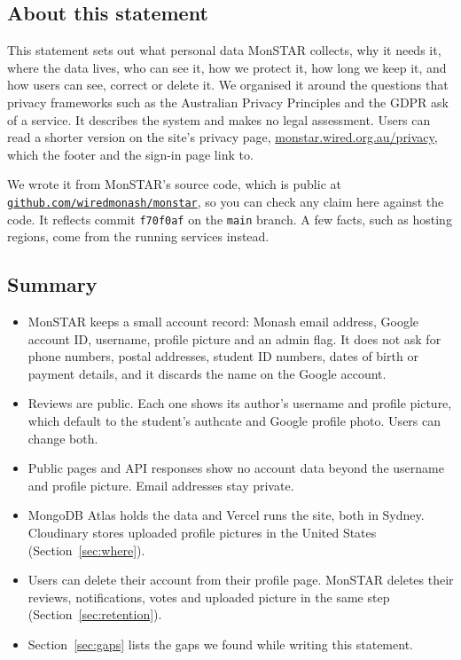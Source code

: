 \documentclass[11pt,a4paper]{article}
\begin{document}
\subsection{About this statement}

This statement sets out what personal data MonSTAR collects, why it needs it,
where the data lives, who can see it, how we protect it, how long we keep it,
and how users can see, correct or delete it.  We organised it around the
questions that privacy frameworks such as the Australian Privacy Principles
and the GDPR ask of a service.  It describes the system and makes no legal
assessment.  Users can read a shorter version on the site's privacy page,
\href{https://monstar.wired.org.au/privacy}{monstar.wired.org.au/privacy},
which the footer and the sign-in page link to.

We wrote it from MonSTAR's source code, which is public at
\href{https://github.com/wiredmonash/monstar}{\nolinkurl{github.com/wiredmonash/monstar}},
so you can check any claim here against the code.  It reflects commit
\texttt{f70f0af} on the \texttt{main} branch.  A few facts, such as hosting
regions, come from the running services instead.

\subsection{Summary}

\begin{itemize}
  \item MonSTAR keeps a small account record: Monash email address, Google
    account ID, username, profile picture and an admin flag.  It does not ask
    for phone numbers, postal addresses, student ID numbers, dates of birth
    or payment details, and it discards the name on the Google account.
  \item Reviews are public.  Each one shows its author's username and profile
    picture, which default to the student's authcate and Google profile
    photo.  Users can change both.
  \item Public pages and API responses show no account data beyond the
    username and profile picture.  Email addresses stay private.
  \item MongoDB Atlas holds the data and Vercel runs the site, both in
    Sydney.  Cloudinary stores uploaded profile pictures in the United
    States (Section~\ref{sec:where}).
  \item Users can delete their account from their profile page.  MonSTAR
    deletes their reviews, notifications, votes and uploaded picture in the
    same step (Section~\ref{sec:retention}).
  \item Section~\ref{sec:gaps} lists the gaps we found while writing this
    statement.
\end{itemize}
\end{document}
